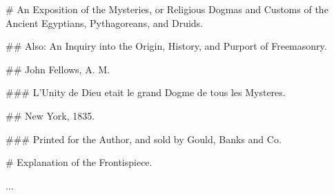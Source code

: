 # An Exposition of the Mysteries, or Religious Dogmas and Customs of the Ancient Egyptians, Pythagoreans, and Druids.

## Also: An Inquiry into the Origin, History, and Purport of Freemasonry.

## John Fellows, A. M.

### L'Unity de Dieu etait le grand Dogme de tous les Mysteres.

## New York, 1835.

### Printed for the Author, and sold by Gould, Banks and Co.

# Explanation of the Frontispiece.

...
